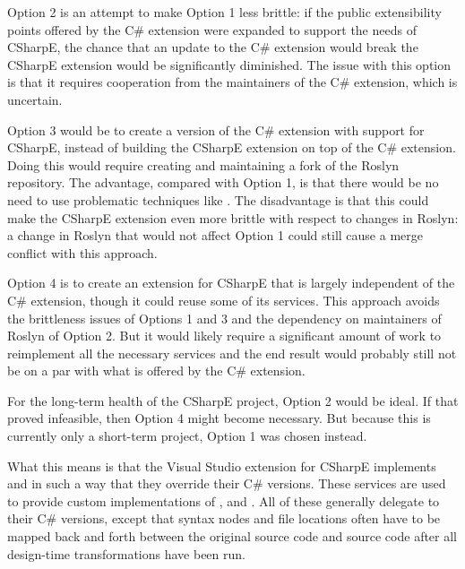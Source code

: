 \medskip

Option 2 is an attempt to make Option 1 less brittle: if the public extensibility points offered by the C\# extension were expanded to support the needs of CSharpE, the chance that an update to the C\# extension would break the CSharpE extension would be significantly diminished. The issue with this option is that it requires cooperation from the maintainers of the C\# extension, which is uncertain.

\medskip

Option 3 would be to create a version of the C\# extension with support for CSharpE, instead of building the CSharpE extension on top of the C\# extension. Doing this would require creating and maintaining a fork of the Roslyn repository. The advantage, compared with Option 1, is that there would be no need to use problematic techniques like . The disadvantage is that this could make the CSharpE extension even more brittle with respect to changes in Roslyn: a change in Roslyn that would not affect Option 1 could still cause a merge conflict with this approach.

\medskip

Option 4 is to create an extension for CSharpE that is largely independent of the C\# extension, though it could reuse some of its services. This approach avoids the brittleness issues of Options 1 and 3 and the dependency on maintainers of Roslyn of Option 2. But it would likely require a significant amount of work to reimplement all the necessary services and the end result would probably still not be on a par with what is offered by the C\# extension.

\medskip

For the long-term health of the CSharpE project, Option 2 would be ideal. If that proved infeasible, then Option 4 might become necessary. But because this is currently only a short-term project, Option 1 was chosen instead.

What this means is that the Visual Studio extension for CSharpE implements  and  in such a way that they override their C\# versions. These services are used to provide custom implementations of ,  and . All of these generally delegate to their C\# versions, except that syntax nodes and file locations often have to be mapped back and forth between the original source code and source code after all design-time transformations have been run.

